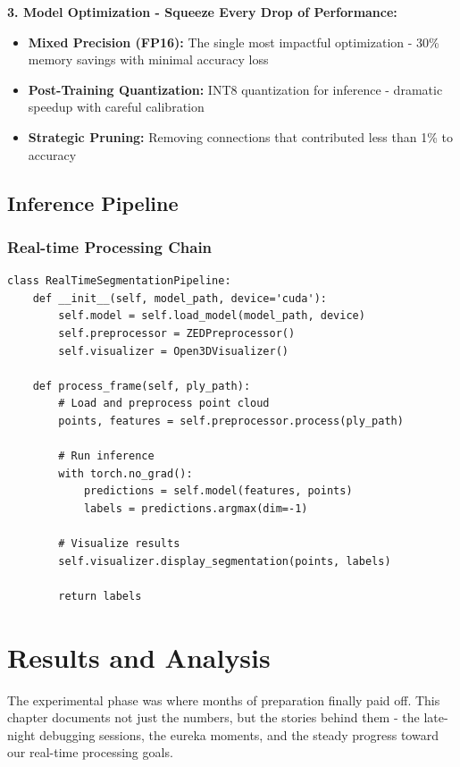 \documentclass[12pt,a4paper]{report}
\begin{document}
\textbf{3. Model Optimization - Squeeze Every Drop of Performance:}

\begin{itemize}
    \item \textbf{Mixed Precision (FP16):} The single most impactful optimization - 30\% memory savings with minimal accuracy loss
    \item \textbf{Post-Training Quantization:} INT8 quantization for inference - dramatic speedup with careful calibration
    \item \textbf{Strategic Pruning:} Removing connections that contributed less than 1\% to accuracy
\end{itemize}

\section{Inference Pipeline}

\subsection{Real-time Processing Chain}

\begin{lstlisting}[caption=Real-time Segmentation Pipeline, label=lst:pipeline]
class RealTimeSegmentationPipeline:
    def __init__(self, model_path, device='cuda'):
        self.model = self.load_model(model_path, device)
        self.preprocessor = ZEDPreprocessor()
        self.visualizer = Open3DVisualizer()

    def process_frame(self, ply_path):
        # Load and preprocess point cloud
        points, features = self.preprocessor.process(ply_path)

        # Run inference
        with torch.no_grad():
            predictions = self.model(features, points)
            labels = predictions.argmax(dim=-1)

        # Visualize results
        self.visualizer.display_segmentation(points, labels)

        return labels
\end{lstlisting}

\chapter{Results and Analysis}

The experimental phase was where months of preparation finally paid off. This chapter documents not just the numbers, but the stories behind them - the late-night debugging sessions, the eureka moments, and the steady progress toward our real-time processing goals.
\end{document}
